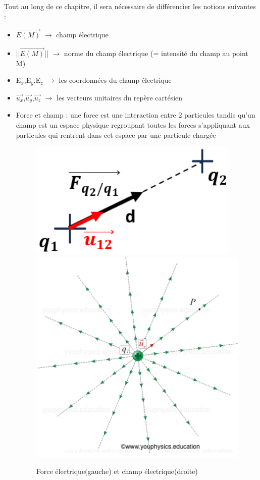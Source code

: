 \documentclass{article}
\begin{document}
Tout au long de ce chapitre, il sera nécessaire de différencier les notions suivantes :
\begin{itemize}
    \item $\overrightarrow{E(M)}$ $\rightarrow$ champ électrique
    \item ||$\overrightarrow{E(M)}$|| $\rightarrow$ norme du champ électrique (= intensité du champ au point M)
    \item E$_{x}$,E$_{y}$,E$_{z}$ $\rightarrow$ les coordonnées du champ électrique
    \item $\overrightarrow{u_{x}}$,$\overrightarrow{u_{y}}$,$\overrightarrow{u_{z}}$ $\rightarrow$ les vecteurs unitaires du repère cartésien \newpage
    \item Force et champ : une force est une interaction entre 2 particules tandis qu'un champ est un espace physique regroupant toutes les forces s'appliquant aux particules qui rentrent dans cet espace par une particule chargée
    \begin{figure}[h]
        \centering
        \includegraphics[scale=0.3]{figure2.png}
        \includegraphics[scale=0.3]{figure2bis.png}
        \caption{Force électrique(gauche) et champ électrique(droite)}
    \end{figure}
\end{itemize}
\end{document}
